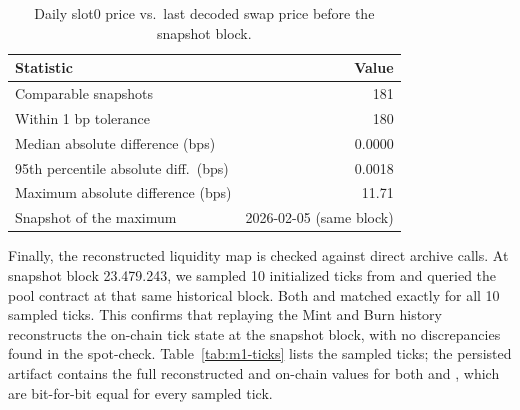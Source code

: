 \begin{table}[t]
    \centering
    \small
    \caption{Daily slot0 price vs.\ last decoded swap price before the snapshot block.}
    \label{tab:m1-slot0}
    \begin{tabular}{lr}
        \toprule
        Statistic & Value \\
        \midrule
        Comparable snapshots                 & 181 \\
        Within 1 bp tolerance                 & 180 \\
        Median absolute difference (bps)      & 0.0000 \\
        95th percentile absolute diff.\ (bps) & 0.0018 \\
        Maximum absolute difference (bps)     & 11.71 \\
        Snapshot of the maximum               & 2026-02-05 (same block) \\
        \bottomrule
    \end{tabular}
\end{table}

Finally, the reconstructed liquidity map is checked against direct archive
 calls.  At snapshot block \num{23,479,243}, we sampled \num{10} 
initialized ticks from  and queried the pool
contract at that same historical block.  Both  and
 matched exactly for all \num{10} sampled ticks. This confirms
that replaying the Mint and Burn history reconstructs the on-chain tick state at
the snapshot block, with no discrepancies found in the spot-check.
Table~\ref{tab:m1-ticks} lists the sampled ticks; the persisted artifact
 contains the full
reconstructed and on-chain values for both  and
, which are bit-for-bit equal for every sampled tick.


